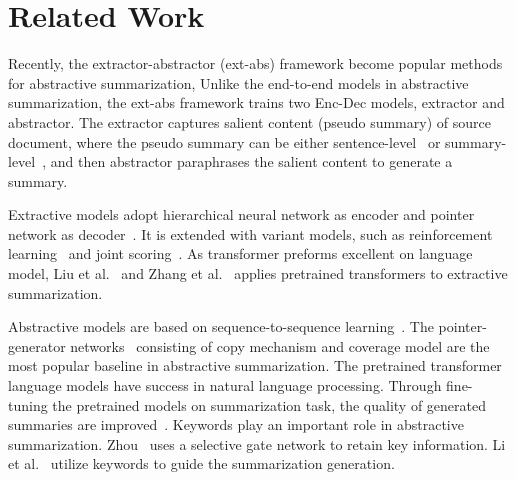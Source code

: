 \section{Related Work}
\label{sec:related}

Recently, the extractor-abstractor (ext-abs) framework
become popular methods for abstractive summarization,
Unlike the end-to-end models
\cite{NallapatiZSGX16,SeeLM17,LiuLZ18,BART19,ProNet20} 
in abstractive summarization,
the ext-abs framework trains two Enc-Dec models, extractor and abstractor.
The extractor captures salient content (pseudo summary) of source document, 
where the pseudo summary can be either sentence-level~\cite{TanWX17, hsu18,FastAbs18}
or summary-level~\cite{summlevel19, SharmaHHW19},
and then abstractor paraphrases the salient content to generate a summary.


Extractive models adopt hierarchical neural network as encoder
and pointer network as decoder~\cite{Cheng16,NallapatiAAAI17}.
It is extended with variant models, 
such as reinforcement learning~\cite{NarayanCL18} and
joint scoring~\cite{score18}. 
As transformer preforms excellent on language model, 
Liu et al.~ and Zhang et al.~ 
applies pretrained transformers to extractive summarization.

Abstractive models are based on sequence-to-sequence learning~\cite{SutskeverVL14,BahdanauCB14}.
The pointer-generator networks~\cite{SeeLM17} consisting of
copy mechanism and coverage model are the most popular 
baseline in abstractive summarization. 
The pretrained transformer language models have success in 
natural language processing.
Through fine-tuning the pretrained models on summarization task,
the quality of generated summaries are improved~\cite{HiBert19,ZhongLWQH19}.
Keywords play an important role in abstractive summarization.
Zhou~\cite{ZhouYWZ17} uses a selective gate network to retain 
key information.
Li et al.~ 
utilize keywords
to guide the summarization generation.

